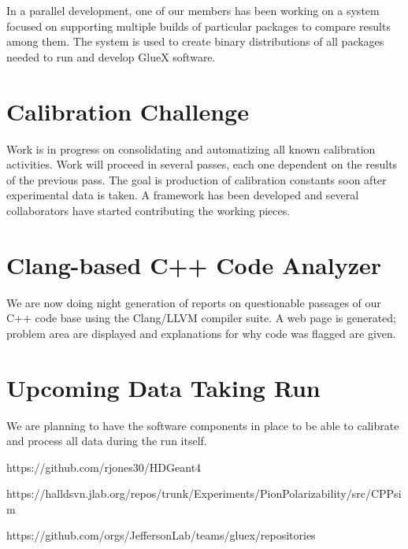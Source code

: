 \documentclass[12pt]{article}
\begin{document}
In a parallel development, one of our members has been working on a
system focused on supporting multiple builds of particular packages to
compare results among them. The system is used to create binary
distributions of all packages needed to run and develop GlueX
software.

\section{Calibration Challenge}

Work is in progress on consolidating and automatizing all known
calibration activities. Work will proceed in several passes, each one
dependent on the results of the previous pass. The goal is production
of calibration constants soon after experimental data is taken. A
framework has been developed and several collaborators have started
contributing the working pieces.

\section{Clang-based C++ Code Analyzer}

We are now doing night generation of reports on questionable passages
of our C++ code base using the Clang/LLVM compiler suite. A web page
is generated; problem area are displayed and explanations for why code
was flagged are given.

\section{Upcoming Data Taking Run}

We are planning to have the software components in place to be able to calibrate and process all data during the run itself.

\begin{thebibliography}{9}

 https://github.com/rjones30/HDGeant4

  https://halldsvn.jlab.org/repos/trunk/Experiments/PionPolarizability/src/CPPsim

  https://github.com/orgs/JeffersonLab/teams/gluex/repositories

\end{thebibliography}
\end{document}
